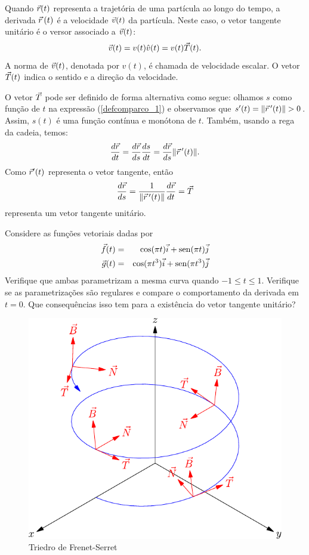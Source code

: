 \begin{obs} Quando $\vec{r}(t)$ representa a trajetória de uma partícula ao longo do tempo, a derivada $\vec{r}\!~(t)$ é a velocidade $\vec{v}(t)$ da partícula. Neste caso, o vetor tangente unitário é o versor associado a $\vec{v}(t)$:
$$\vec{v}(t)=v(t) \hat{v}(t)=v(t) \vec{T}(t).$$
A norma de $\vec{v}(t)$, denotada por $v(t)$, é chamada de velocidade escalar. O vetor $\vec{T}(t)$ indica o sentido e a direção da velocidade.
\end{obs}

O vetor $\vec{T}$ pode ser definido de forma alternativa como segue: olhamos $s$ como função de $t$ na expressão (\ref{defcomparco_1}) e observamos que $s'(t)=\|\vct{r}\!~'(t)\|>0$. Assim, $s(t)$ é uma função contínua e monótona de $t$. Também, usando a rega da cadeia, temos:
$$
\frac{d\vec{r}}{dt}=\frac{d\vec{r}}{ds}\frac{ds}{dt}=\frac{d\vec{r}}{ds}\|\vec{r}\!~'(t)\|.
$$
Como $\vec{r}'(t)$ representa o vetor tangente, então
$$
\frac{d\vec{r}}{ds}=\frac{1}{\|\vec{r}\!~'(t)\|}\frac{d\vec{r}}{dt}=\vec{T}
$$
representa um vetor tangente unitário.

\begin{exer}
Considere as funções vetoriais dadas por
\begin{eqnarray*}
\vec{f}(t)&=&\cos(\pi t)\vec{i}+\operatorname{sen}(\pi t)\vec{j}\\
\vec{g}(t)&=&\cos(\pi t^3)\vec{i}+\operatorname{sen}(\pi t^3)\vec{j}
\end{eqnarray*}
Verifique que ambas parametrizam a mesma curva quando $-1\leq t \leq 1$. Verifique se as parametrizações são regulares e compare o comportamento da derivada em $t=0$. Que consequências isso tem para a existência do vetor tangente unitário? 
\end{exer}


\begin{figure}%
\begin{center}
    \includegraphics{./cap_curvas/pics/helice_TNB}
\caption{Triedro de Frenet-Serret}\label{Frenet_Serret}
  \end{center}
\end{figure}


